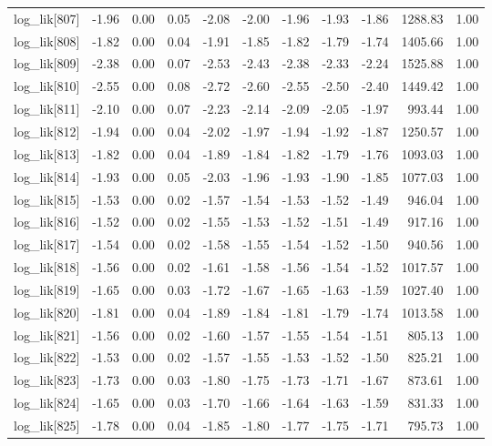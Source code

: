 \begin{table}[ht]
\begin{tabular}{rrrrrrrrrrr}
  log\_lik[807] & -1.96 & 0.00 & 0.05 & -2.08 & -2.00 & -1.96 & -1.93 & -1.86 & 1288.83 & 1.00 \\ 
  log\_lik[808] & -1.82 & 0.00 & 0.04 & -1.91 & -1.85 & -1.82 & -1.79 & -1.74 & 1405.66 & 1.00 \\ 
  log\_lik[809] & -2.38 & 0.00 & 0.07 & -2.53 & -2.43 & -2.38 & -2.33 & -2.24 & 1525.88 & 1.00 \\ 
  log\_lik[810] & -2.55 & 0.00 & 0.08 & -2.72 & -2.60 & -2.55 & -2.50 & -2.40 & 1449.42 & 1.00 \\ 
  log\_lik[811] & -2.10 & 0.00 & 0.07 & -2.23 & -2.14 & -2.09 & -2.05 & -1.97 & 993.44 & 1.00 \\ 
  log\_lik[812] & -1.94 & 0.00 & 0.04 & -2.02 & -1.97 & -1.94 & -1.92 & -1.87 & 1250.57 & 1.00 \\ 
  log\_lik[813] & -1.82 & 0.00 & 0.04 & -1.89 & -1.84 & -1.82 & -1.79 & -1.76 & 1093.03 & 1.00 \\ 
  log\_lik[814] & -1.93 & 0.00 & 0.05 & -2.03 & -1.96 & -1.93 & -1.90 & -1.85 & 1077.03 & 1.00 \\ 
  log\_lik[815] & -1.53 & 0.00 & 0.02 & -1.57 & -1.54 & -1.53 & -1.52 & -1.49 & 946.04 & 1.00 \\ 
  log\_lik[816] & -1.52 & 0.00 & 0.02 & -1.55 & -1.53 & -1.52 & -1.51 & -1.49 & 917.16 & 1.00 \\ 
  log\_lik[817] & -1.54 & 0.00 & 0.02 & -1.58 & -1.55 & -1.54 & -1.52 & -1.50 & 940.56 & 1.00 \\ 
  log\_lik[818] & -1.56 & 0.00 & 0.02 & -1.61 & -1.58 & -1.56 & -1.54 & -1.52 & 1017.57 & 1.00 \\ 
  log\_lik[819] & -1.65 & 0.00 & 0.03 & -1.72 & -1.67 & -1.65 & -1.63 & -1.59 & 1027.40 & 1.00 \\ 
  log\_lik[820] & -1.81 & 0.00 & 0.04 & -1.89 & -1.84 & -1.81 & -1.79 & -1.74 & 1013.58 & 1.00 \\ 
  log\_lik[821] & -1.56 & 0.00 & 0.02 & -1.60 & -1.57 & -1.55 & -1.54 & -1.51 & 805.13 & 1.00 \\ 
  log\_lik[822] & -1.53 & 0.00 & 0.02 & -1.57 & -1.55 & -1.53 & -1.52 & -1.50 & 825.21 & 1.00 \\ 
  log\_lik[823] & -1.73 & 0.00 & 0.03 & -1.80 & -1.75 & -1.73 & -1.71 & -1.67 & 873.61 & 1.00 \\ 
  log\_lik[824] & -1.65 & 0.00 & 0.03 & -1.70 & -1.66 & -1.64 & -1.63 & -1.59 & 831.33 & 1.00 \\ 
  log\_lik[825] & -1.78 & 0.00 & 0.04 & -1.85 & -1.80 & -1.77 & -1.75 & -1.71 & 795.73 & 1.00 \\ 

\end{tabular}
\end{table}
